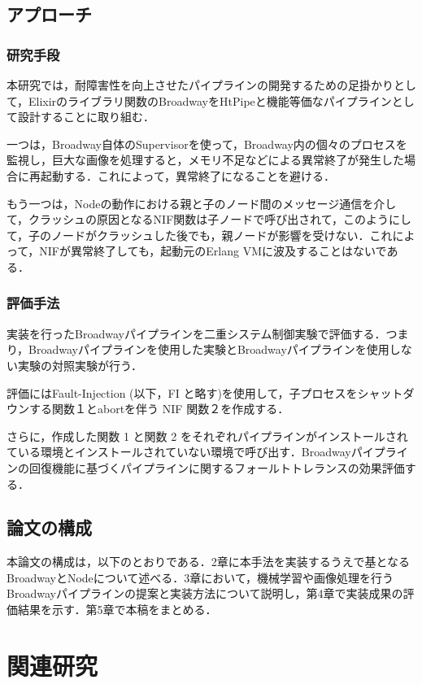 \documentclass[a4paper]{jreport}	%
\begin{document}
\section{アプローチ}
\subsection{研究手段}
本研究では，耐障害性を向上させたパイプラインの開発するための足掛かりとして，Elixirのライブラリ関数のBroadwayをHtPipeと機能等価なパイプラインとして設計することに取り組む．

一つは，Broadway自体のSupervisorを使って，Broadway内の個々のプロセスを監視し，巨大な画像を処理すると，メモリ不足などによる異常終了が発生した場合に再起動する．これによって，異常終了になることを避ける．

もう一つは，Nodeの動作における親と子のノード間のメッセージ通信を介して，クラッシュの原因となるNIF関数は子ノードで呼び出されて，このようにして，子のノードがクラッシュした後でも，親ノードが影響を受けない．これによって，NIFが異常終了しても，起動元のErlang VMに波及することはないである．

\subsection{評価手法}

実装を行ったBroadwayパイプラインを二重システム制御実験で評価する．つまり，Broadwayパイプラインを使用した実験とBroadwayパイプラインを使用しない実験の対照実験が行う．

評価にはFault-Injection (以下，FI と略す)を使用して，子プロセスをシャットダウンする関数１とabortを伴う NIF 関数２を作成する．

さらに，作成した関数 1 と関数 2 をそれぞれパイプラインがインストールされている環境とインストールされていない環境で呼び出す．Broadwayパイプラインの回復機能に基づくパイプラインに関するフォールトトレランスの効果評価する．

\section{論文の構成}

本論文の構成は，以下のとおりである．2章に本手法を実装するうえで基となるBroadwayとNodeについて述べる．3章において，機械学習や画像処理を行うBroadwayパイプラインの提案と実装方法について説明し，第4章で実装成果の評価結果を示す．第5章で本稿をまとめる．


\chapter{関連研究}
\end{document}
